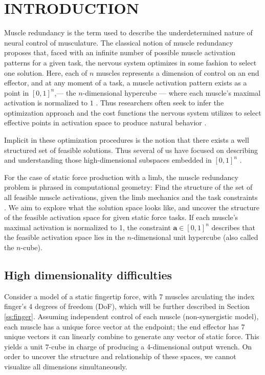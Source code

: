 
\section{INTRODUCTION}

Muscle redundancy is the term used to describe the underdetermined nature of neural control of musculature.
The classical notion of muscle redundancy  proposes that, faced with an infinite number of possible muscle activation patterns for a given task, the nervous system optimizes in some fashion to select one solution.
Here, each of $n$ muscles represents a dimension of control on an end effector, and at any moment of a task, a muscle activation pattern exists as a point in $[0,1]^n$,--- the $n$-dimensional hypercube --- where each muscle's maximal activation is normalized to $1$ \cite{Valero-Cuevas1998Large}.
Thus researchers often seek to infer the optimization approach and the cost functions the nervous system utilizes to select effective points in activation space to produce natural behavior \cite{Chao1978Graphical,Prilutsky2000Muscle,scott2004optimal,todorov2002optimal,crowninshield1981physiologically,higginson2005simulated}. 

Implicit in these optimization procedures is the notion that there exists a well structured set of feasible solutions. Thus several of us have focused on describing and understanding those high-dimensional subspaces  embedded in $[0,1]^n$ \cite{kutch2011muscle,kutch2012challenges,sohn2013cat_bounding_box,Valero-Cuevas1998Large,Valero-Cuevas2015high-dimensional}.

For the case of static force production with a limb, the muscle redundancy problem is phrased in computational geometry: Find the structure of the set of all feasible muscle activations, given the limb mechanics and the task constraints \cite{avis1992Pivoting,Valero-Cuevas1998Large,Valero-Cuevas2009mathematical,Valero-Cuevas2015high-dimensional}. We aim to explore what the solution space looks like, and uncover the structure of the feasible activation space for given static force tasks.
If each muscle's maximal activation is normalized to 1, the constraint $\textbf{a} \in [0,1]^n$ describes that the feasible activation space lies in the $n$-dimensional unit hypercube (also called the $n$-cube).%

\subsection{High dimensionality difficulties}
Consider a model of a static fingertip force, with 7 muscles arculating the index finger's 4 degrees of freedom (DoF), which will be further described in Section \ref{ss:finger}.
Assuming independent control of each muscle (non-synergistic model), each muscle has a unique force vector at the endpoint; the end effector has 7 unique vectors it can linearly combine to generate any vector of static force.
This yields a unit $7$-cube in charge of producing a 4-dimensional output wrench.
On order to uncover the structure and relationship of these spaces, we cannot visualize all dimensions simultaneously. %

